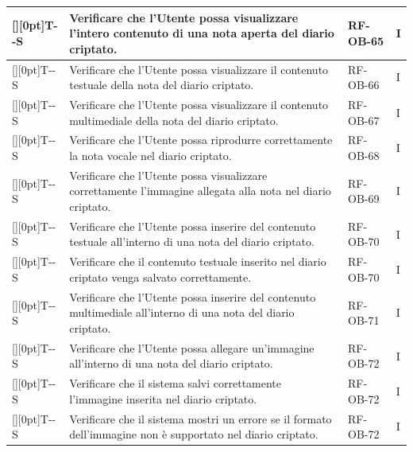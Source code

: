 \documentclass[a4paper,12pt]{article}
\newcounter{testsys}
\newcommand{\systestcode}{%
  \raisebox{0pt}[\height][0pt]{\hypertarget{T-\arabic{testsys}-S}{}}T-\arabic{testsys}-S%
}
\begin{document}
\begin{longtable}{| >{\centering\arraybackslash}p{} | >{\raggedright\arraybackslash}p{} | >{\centering\arraybackslash}p{} | >{\centering\arraybackslash}p{} |}
\stepcounter{testsys} \systestcode & Verificare che l'Utente possa visualizzare l'intero contenuto di una nota aperta del diario criptato. & RF-OB-65 & I \\
\hline

\stepcounter{testsys} \systestcode & Verificare che l'Utente possa visualizzare il contenuto testuale della nota del diario criptato. & RF-OB-66 & I \\
\hline

\stepcounter{testsys} \systestcode & Verificare che l'Utente possa visualizzare il contenuto multimediale della nota del diario criptato. & RF-OB-67 & I \\
\hline

\stepcounter{testsys} \systestcode & Verificare che l'Utente possa riprodurre correttamente la nota vocale nel diario criptato. & RF-OB-68 & I \\
\hline

\stepcounter{testsys} \systestcode & Verificare che l'Utente possa visualizzare correttamente l'immagine allegata alla nota nel diario criptato. & RF-OB-69 & I \\
\hline

\stepcounter{testsys} \systestcode & Verificare che l'Utente possa inserire del contenuto testuale all'interno di una nota del diario criptato. & RF-OB-70 & I \\
\hline

\stepcounter{testsys} \systestcode & Verificare che il contenuto testuale inserito nel diario criptato venga salvato correttamente. & RF-OB-70 & I \\
\hline

\stepcounter{testsys} \systestcode & Verificare che l'Utente possa inserire del contenuto multimediale all'interno di una nota del diario criptato. & RF-OB-71 & I \\
\hline

\stepcounter{testsys} \systestcode & Verificare che l'Utente possa allegare un'immagine all'interno di una nota del diario criptato. & RF-OB-72 & I \\
\hline

\stepcounter{testsys} \systestcode & Verificare che il sistema salvi correttamente l'immagine inserita nel diario criptato. & RF-OB-72 & I \\
\hline

\stepcounter{testsys} \systestcode & Verificare che il sistema mostri un errore se il formato dell'immagine non è supportato nel diario criptato. & RF-OB-72 & I \\
\hline


\end{longtable}
\end{document}
